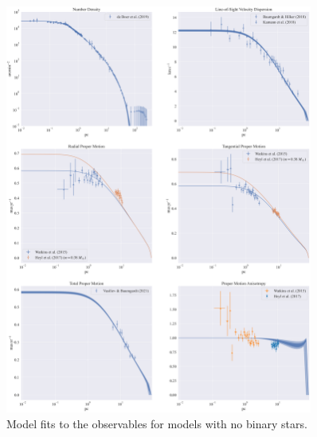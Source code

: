\begin{figure}
	\begin{center}
		\includegraphics[width=0.9\textwidth]{figures/prev_nobin/obs_panel.png}
	\end{center}
	\caption{Model fits to the observables for models with no binary stars.}
	\label{fig:nobin_obs_panel}
\end{figure}

